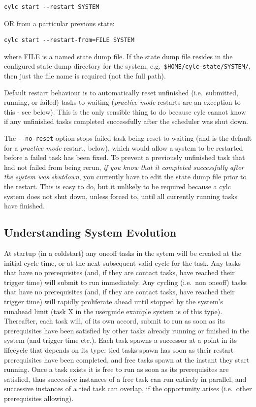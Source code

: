 \documentclass[11pt,a4paper]{article}
\begin{document}
\begin{lstlisting}
cylc start --restart SYSTEM
\end{lstlisting}

OR from a particular previous state:

\begin{lstlisting}
cylc start --restart-from=FILE SYSTEM
\end{lstlisting}

where FILE is a named state dump file. If the state dump file resides in
the configured state dump directory for the system, e.g.\  
\lstinline=$HOME/cylc-state/SYSTEM/=, then just the file name is required 
(not the full path).

Default restart behaviour is to automatically reset unfinished (i.e.\
submitted, running, or failed) tasks to waiting ({\em practice mode}
restarts are an exception to this - see below).  This is the only
sensible thing to do because cylc cannot know if any unfinished tasks
completed successfully after the scheduler was shut down.  

The \lstinline=--no-reset= option stops failed task being reset to 
waiting (and is the default for a {\em practice mode} restart, below), 
which would allow a system to be restarted before a failed task has been
fixed. To prevent a previously unfinished task that had not failed from
being rerun, {\em if you know that it completed successfully after the
system was shutdown}, you currently have to edit the state dump file
prior to the restart.  This is easy to do, but it unlikely to be
required because a cylc system does not shut down, unless forced to, until
all currently running tasks have finished.


\subsection{Understanding System Evolution}
\label{UnderstandingSystemEvolution}

At startup (in a coldstart) any oneoff tasks in the sytem will be
created at the initial cycle time, or at the next subsequent valid cycle
for the task. Any tasks that have no prerequisites (and, if they are
contact tasks, have reached their trigger time) will submit to run
immediately. Any cycling (i.e.\ non oneoff) tasks that have no
prerequisites (and, if they are contact tasks, have reached their
trigger time) will rapidly proliferate ahead until stopped by the
system's runahead limit (task X in the userguide example system
is of this type).  Thereafter, each task will, of its own accord, submit
to run as soon as its prerequisites have been satisfied by other tasks
already running or finished in the system (and trigger time etc.). 
Each task spawns a successor at a point in its lifecycle that depends on
its type: tied tasks spawn has soon as their restart prerequisites have
been completed, and free tasks spawn at the instant they start running. 
Once a task exists it is free to run as soon as its prerequisites are
satisfied, thus successive instances of a free task can run entirely in
parallel, and successive instances of a tied task can overlap, 
if the opportunity arises (i.e.\ other prerequisites allowing).
\end{document}
